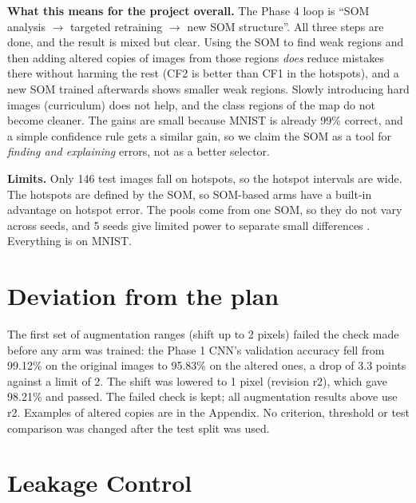 \documentclass[11pt]{article}
\begin{document}
\textbf{What this means for the project overall.} The Phase 4 loop is ``SOM analysis $\rightarrow$ targeted retraining $\rightarrow$ new SOM structure''. All three steps are done, and the result is mixed but clear. Using the SOM to find weak regions and then adding altered copies of images from those regions \emph{does} reduce mistakes there without harming the rest (CF2 is better than CF1 in the hotspots), and a new SOM trained afterwards shows smaller weak regions. Slowly introducing hard images (curriculum) does not help, and the class regions of the map do not become cleaner. The gains are small because MNIST is already 99\% correct, and a simple confidence rule gets a similar gain, so we claim the SOM as a tool for \emph{finding and explaining} errors, not as a better selector.

\textbf{Limits.} Only 146 test images fall on hotspots, so the hotspot intervals are wide. The hotspots are defined by the SOM, so SOM-based arms have a built-in advantage on hotspot error. The pools come from one SOM, so they do not vary across seeds, and 5 seeds give limited power to separate small differences \parencite{bouthillier2021variance}. Everything is on MNIST.

\section{Deviation from the plan}

The first set of augmentation ranges (shift up to 2 pixels) failed the check made before any arm was trained: the Phase 1 CNN's validation accuracy fell from 99.12\% on the original images to 95.83\% on the altered ones, a drop of 3.3 points against a limit of 2. The shift was lowered to 1 pixel (revision r2), which gave 98.21\% and passed. The failed check is kept; all augmentation results above use r2. Examples of altered copies are in the Appendix. No criterion, threshold or test comparison was changed after the test split was used.

\section{Leakage Control}
\end{document}
